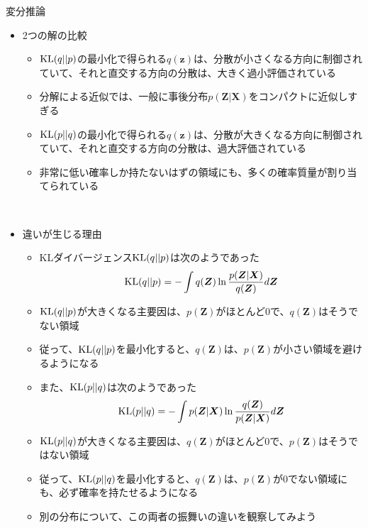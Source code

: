 \documentclass[dvipdfmx,notheorems,t]{beamer}
\begin{document}
\begin{frame}{変分推論}

\begin{itemize}
	\item 2つの解の比較
	\begin{itemize}
		\item $\operatorname{KL}(q || p)$の最小化で得られる$q(\bm{z})$は、\alert{分散が小さくなる方向に制御されていて}、それと直交する方向の分散は、大きく過小評価されている
		\item 分解による近似では、一般に事後分布$p(\bm{Z} | \bm{X})$を\alert{コンパクトに近似しすぎる}
		\newline
		\item $\operatorname{KL}(p || q)$の最小化で得られる$q(\bm{z})$は、\alert{分散が大きくなる方向に制御されていて}、それと直交する方向の分散は、過大評価されている
		\item 非常に低い確率しか持たないはずの領域にも、多くの確率質量が割り当てられている
	\end{itemize} \
	
	\item 違いが生じる理由
	\begin{itemize}
		\item KLダイバージェンス$\operatorname{KL}(q || p)$は次のようであった
		\begin{equation}
			\operatorname{KL}(q || p) = -\int q(\bm{Z}) \ln \frac{p(\bm{Z} | \bm{X})}{q(\bm{Z})} d\bm{Z}
		\end{equation}
		
		\item $\operatorname{KL}(q || p)$が大きくなる主要因は、$p(\bm{Z})$がほとんど$0$で、$q(\bm{Z})$はそうでない領域
		\item 従って、$\operatorname{KL}(q || p)$を最小化すると、$q(\bm{Z})$は、\color{red}$p(\bm{Z})$が小さい領域を避けるようになる\normalcolor
		\newline
		\item また、$\operatorname{KL}(p || q)$は次のようであった
		\begin{equation}
			\operatorname{KL}(p || q) = -\int p(\bm{Z} | \bm{X}) \ln \frac{q(\bm{Z})}{p(\bm{Z} | \bm{X})} d\bm{Z}
		\end{equation}
		
		\item $\operatorname{KL}(p || q)$が大きくなる主要因は、$q(\bm{Z})$がほとんど$0$で、$p(\bm{Z})$はそうではない領域
		\item 従って、$\operatorname{KL}(p || q)$を最小化すると、$q(\bm{Z})$は、\color{red}$p(\bm{Z})$が$0$でない領域にも、必ず確率を持たせるようになる\normalcolor
		\newline
		\item 別の分布について、この両者の振舞いの違いを観察してみよう
	\end{itemize}
\end{itemize}

\end{frame}
\end{document}
